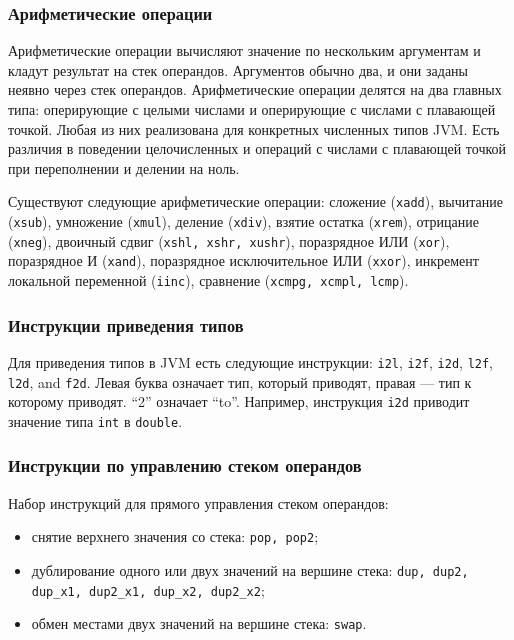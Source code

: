 \documentclass[14pt]{extarticle}
\begin{document}
\subsubsection*{Арифметические операции}
Арифметические операции вычисляют значение по нескольким аргументам и кладут результат на стек операндов. Аргументов обычно два, и они заданы неявно через стек операндов. Арифметические операции делятся на два главных типа: оперирующие с целыми числами и оперирующие с числами с плавающей точкой. Любая из них реализована для конкретных численных типов JVM. Есть различия в поведении целочисленных и операций с числами с плавающей точкой при переполнении и делении на ноль. 

Существуют следующие арифметические операции: сложение (\texttt{xadd}), вычитание (\texttt{xsub}), умножение (\texttt{xmul}), деление (\texttt{xdiv}), взятие остатка (\texttt{xrem}), отрицание (\texttt{xneg}), двоичный сдвиг (\texttt{xshl, xshr, xushr}), поразрядное ИЛИ (\texttt{xor}), поразрядное И (\texttt{xand}), поразрядное исключительное ИЛИ (\texttt{xxor}), инкремент локальной переменной (\texttt{iinc}), сравнение (\texttt{xcmpg, xcmpl, lcmp}).

\subsubsection*{Инструкции приведения типов}
Для приведения типов в JVM есть следующие инструкции: \texttt{i2l}, \texttt{i2f}, \texttt{i2d}, \texttt{l2f}, \texttt{l2d}, and \texttt{f2d}. Левая буква означает тип, который приводят, правая --- тип к которому приводят. ``2'' означает ``to''. Например,  инструкция \texttt{i2d} приводит значение типа \texttt{int} в \texttt{double}.
  
\subsubsection*{Инструкции по управлению стеком операндов}
Набор инструкций для прямого управления стеком операндов:
\begin{itemize}
\item снятие верхнего значения со стека: \texttt{pop, pop2};
\item дублирование одного или двух значений на вершине стека: \texttt{dup, dup2, dup\_x1, dup2\_x1, dup\_x2, dup2\_x2};
\item обмен местами двух значений на вершине стека: \texttt{swap}.
\end {itemize}
\end{document}
